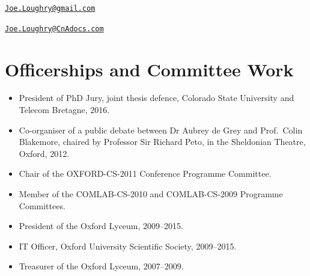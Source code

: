 \documentclass[12pt,twoside,letterpaper]{article}
\begin{document}


\vspace{-10mm}


\vspace{-7mm}


\vspace{-7mm}


\newpage


\vspace*{-23mm}\hfill\href{mailto:Joe.Loughry@gmail.com}%
{\nolinkurl{Joe.Loughry@gmail.com}}

\vspace*{-7mm}


\vspace{-7mm}


\vspace{-7mm}


\vspace{-7mm}


\vspace{-7mm}


\vspace{-7mm}


\vspace{3mm}

\noindent


\newpage


\vspace*{-23mm}\hfill\href{mailto:Joe.Loughry@CnAdocs.com}%
{\nolinkurl{Joe.Loughry@CnAdocs.com}}

\vspace*{-7mm}
\section*{Officerships and Committee Work}
\vspace{-2mm}

\begin{itemize}
    \item President of PhD Jury, joint thesis defence, Colorado
        State University and Telecom Bretagne, 2016.
	\item Co-organiser of a public debate between Dr Aubrey de Grey
		and Prof.\ Colin Blakemore, chaired by Professor Sir Richard
		Peto, in the Sheldonian Theatre, Oxford, 2012.
	\item Chair of the OXFORD-CS-2011 Conference Programme Committee.
	\item Member of the COMLAB-CS-2010 and COMLAB-CS-2009 Programme
		Committees.
	\item President of the Oxford Lyceum, 2009--2015.
	\item IT Officer, Oxford University Scientific Society, 2009--2015.
	\item Treasurer of the Oxford Lyceum, 2007--2009.
\end{itemize}
\end{document}
